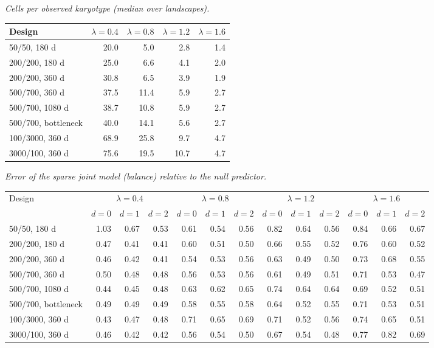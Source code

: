 \noindent\textit{Cells per observed karyotype (median over landscapes).}
\begin{center}
\footnotesize
\setlength{\tabcolsep}{3pt}
\begin{tabular}{lrrrr}
\toprule
Design & $\lambda=0.4$ & $\lambda=0.8$ & $\lambda=1.2$ & $\lambda=1.6$ \\
\midrule
50/50, 180 d & 20.0 & 5.0 & 2.8 & 1.4 \\
200/200, 180 d & 25.0 & 6.6 & 4.1 & 2.0 \\
200/200, 360 d & 30.8 & 6.5 & 3.9 & 1.9 \\
500/700, 360 d & 37.5 & 11.4 & 5.9 & 2.7 \\
500/700, 1080 d & 38.7 & 10.8 & 5.9 & 2.7 \\
500/700, bottleneck & 40.0 & 14.1 & 5.6 & 2.7 \\
100/3000, 360 d & 68.9 & 25.8 & 9.7 & 4.7 \\
3000/100, 360 d & 75.6 & 19.5 & 10.7 & 4.7 \\
\bottomrule
\end{tabular}
\end{center}

\noindent\textit{Error of the sparse joint model (balance) relative to the null predictor.}
\begin{center}
\footnotesize
\setlength{\tabcolsep}{3pt}
\begin{tabular}{l*{12}{r}}
\toprule
Design & \multicolumn{3}{c}{$\lambda=0.4$} & \multicolumn{3}{c}{$\lambda=0.8$} & \multicolumn{3}{c}{$\lambda=1.2$} & \multicolumn{3}{c}{$\lambda=1.6$} \\
\cmidrule(lr){2-4}\cmidrule(lr){5-7}\cmidrule(lr){8-10}\cmidrule(lr){11-13}
 & $d=0$ & $d=1$ & $d=2$ & $d=0$ & $d=1$ & $d=2$ & $d=0$ & $d=1$ & $d=2$ & $d=0$ & $d=1$ & $d=2$ \\
\midrule
50/50, 180 d & 1.03 & 0.67 & 0.53 & 0.61 & 0.54 & 0.56 & 0.82 & 0.64 & 0.56 & 0.84 & 0.66 & 0.67 \\
200/200, 180 d & 0.47 & 0.41 & 0.41 & 0.60 & 0.51 & 0.50 & 0.66 & 0.55 & 0.52 & 0.76 & 0.60 & 0.52 \\
200/200, 360 d & 0.46 & 0.42 & 0.41 & 0.54 & 0.53 & 0.56 & 0.63 & 0.49 & 0.50 & 0.73 & 0.68 & 0.55 \\
500/700, 360 d & 0.50 & 0.48 & 0.48 & 0.56 & 0.53 & 0.56 & 0.61 & 0.49 & 0.51 & 0.71 & 0.53 & 0.47 \\
500/700, 1080 d & 0.44 & 0.45 & 0.48 & 0.63 & 0.62 & 0.65 & 0.74 & 0.64 & 0.64 & 0.69 & 0.52 & 0.51 \\
500/700, bottleneck & 0.49 & 0.49 & 0.49 & 0.58 & 0.55 & 0.58 & 0.64 & 0.52 & 0.55 & 0.71 & 0.53 & 0.51 \\
100/3000, 360 d & 0.43 & 0.47 & 0.48 & 0.71 & 0.65 & 0.69 & 0.71 & 0.52 & 0.56 & 0.74 & 0.65 & 0.51 \\
3000/100, 360 d & 0.46 & 0.42 & 0.42 & 0.56 & 0.54 & 0.50 & 0.67 & 0.54 & 0.48 & 0.77 & 0.82 & 0.69 \\
\bottomrule
\end{tabular}
\end{center}

